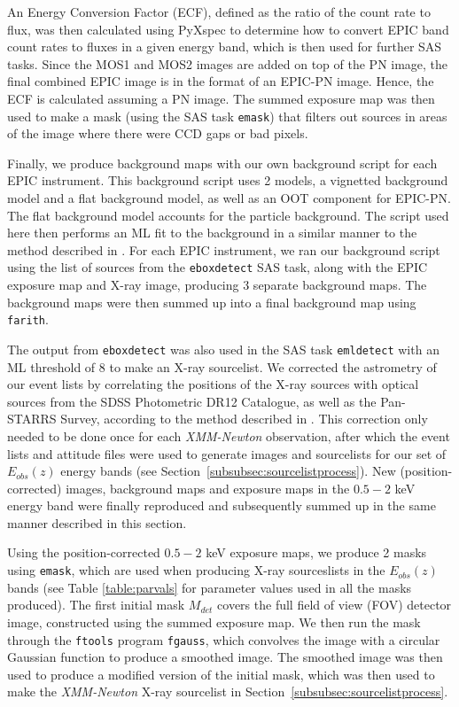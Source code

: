 \documentclass[fleqn,usenatbib]{mnras}
\begin{document}
    	An Energy Conversion Factor (ECF), defined as the ratio of the count rate to flux, was then calculated using PyXspec to determine how to convert EPIC band count rates to fluxes in a given energy band, which is then used for further SAS tasks.
    	Since the MOS1 and MOS2 images are added on top of the PN image, the final combined EPIC image is in the format of an EPIC-PN image. 
    	Hence, the ECF is calculated assuming a PN image.
        The summed exposure map was then used to make a mask (using the SAS task \texttt{emask}) that filters out sources in areas of the image where there were CCD gaps or bad pixels. 
        
        Finally, we produce background maps with our own background script for each EPIC instrument.
    	This background script uses 2 models, a vignetted background model and a flat background model, as well as an OOT component for EPIC-PN. 
    	The flat background model accounts for the particle background.
    	The script used here then performs an ML fit to the background in a similar manner to the method described in \cite{loaring2005xmm13h}.
        For each EPIC instrument, we ran our background script using the list of sources from the \texttt{eboxdetect} SAS task, along with the EPIC exposure map and X-ray image, producing 3 separate background maps.
        The background maps were then summed up into a final background map using \texttt{farith}.
        
        The output from \texttt{eboxdetect} was also used in the SAS task \texttt{emldetect} with an ML threshold of 8 to make an X-ray sourcelist.
        We corrected the astrometry of our event lists by correlating the positions of the X-ray sources with optical sources from the SDSS Photometric DR12 Catalogue, as well as the Pan-STARRS Survey, according to the method described in \cite{traulsen2020xmmstacked}.
        This correction only needed to be done once for each \textit{XMM-Newton} observation, after which the event lists and attitude files were used to generate images and sourcelists for our set of $E_{obs}(z)$ energy bands (see Section~\ref{subsubsec:sourcelistprocess}).
        New (position-corrected) images, background maps and exposure maps in the $0.5-2$ keV energy band were finally reproduced and subsequently summed up in the same manner described in this section.
        
        Using the position-corrected $0.5-2$ keV exposure maps, we produce 2 masks using \texttt{emask}, which are used when producing X-ray sourceslists in the $E_{obs}(z)$ bands (see Table \ref{table:parvals} for parameter values used in all the masks produced).
        The first initial mask $M_{det}$ covers the full field of view (FOV) detector image, constructed using the summed exposure map.
        We then run the mask through the \texttt{ftools} program \texttt{fgauss}, which convolves the image with a circular Gaussian function to produce a smoothed image.
        The smoothed image was then used to produce a modified version of the initial mask, which was then used to make the \textit{XMM-Newton} X-ray sourcelist in Section~\ref{subsubsec:sourcelistprocess}.
        
\end{document}
